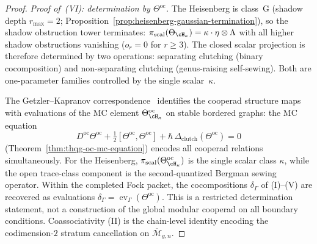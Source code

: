 \begin{proof}
\medskip\noindent
\textit{Proof of~\textup{(VI)}: determination by
$\Theta^{\mathrm{oc}}$.}
The Heisenberg is class~G (shadow depth $r_{\max} = 2$;
Proposition~\ref{prop:heisenberg-gaussian-termination}), so the
shadow obstruction tower terminates:
$\pi_{\mathrm{scal}}(\Theta_{\cH_\kappa})
= \kappa \cdot \eta \otimes \Lambda$
with all higher shadow obstructions vanishing ($o_r = 0$ for
$r \geq 3$).
The closed scalar projection is therefore determined by two
operations: separating clutching (binary cocomposition) and
non-separating clutching (genus-raising self-sewing). Both are
one-parameter families controlled by the single scalar~$\kappa$.

The Getzler--Kapranov correspondence~\cite{GeK98} identifies the
cooperad structure maps with evaluations of the MC element
$\Theta^{\mathrm{oc}}_{\cH_\kappa}$ on stable bordered graphs:
the MC equation
\[
D^{\mathrm{oc}}\Theta^{\mathrm{oc}}
+ \tfrac{1}{2}[\Theta^{\mathrm{oc}}, \Theta^{\mathrm{oc}}]
+ \hbar\,\Delta_{\mathrm{clutch}}(\Theta^{\mathrm{oc}})
= 0
\]
(Theorem~\ref{thm:thqg-oc-mc-equation}) encodes all cooperad
relations simultaneously. For the Heisenberg,
$\pi_{\mathrm{scal}}(\Theta^{\mathrm{oc}}_{\cH_\kappa})$ is the
single scalar class $\kappa$, while the open trace-class component is
the second-quantized Bergman sewing operator. Within the completed
Fock packet, the cocompositions $\delta_\Gamma$ of (I)--(V) are
recovered as evaluations
$\delta_\Gamma = \operatorname{ev}_\Gamma(\Theta^{\mathrm{oc}})$.
This is a restricted determination statement, not a construction of
the global modular cooperad on all boundary conditions.
Coassociativity (II) is the chain-level identity encoding the
codimension-$2$ stratum cancellation on
$\overline{\mathcal{M}}_{g,n}$.
\end{proof}

